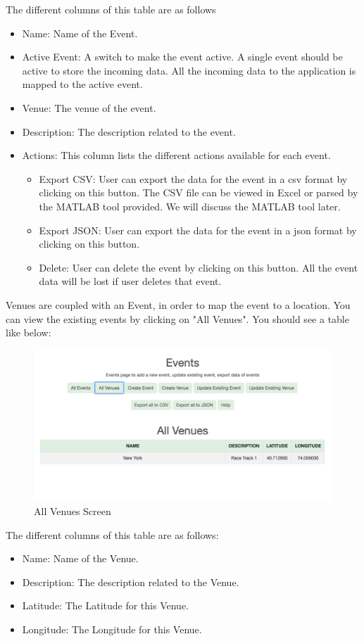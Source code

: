 \documentclass[12pt, letterpaper]{article}
\begin{document}
{{{{{{{{{\par The different columns of this table are as follows

\begin{itemize}
	\item Name: Name of the Event.
	\item Active Event: A switch to make the event active. A single event should be active to store the incoming data. All the incoming data to the application is mapped to the active event.
	\item Venue: The venue of the event.
	\item Description: The description related to the event.
	\item Actions: This column lists the different actions available for each event. \\
	\newpage
	\begin{itemize}
		\item Export CSV: User can export the data for the event in a csv format by clicking on this button. The CSV file can be viewed in Excel or parsed by the MATLAB tool provided. We will discuss the MATLAB tool later.
		\item Export JSON: User can export the data for the event in a json format by clicking on this button.
		\item Delete: User can delete the event by clicking on this button. All the event data will be lost if user deletes that event.
	\end{itemize}
\end{itemize}

\par Venues are coupled with an Event, in order to map the event to a location. You can view the existing events by clicking on "All Venues". You should see a table like below:
\begin{figure}[h!]
	\centering
	\includegraphics[width=1\columnwidth]{assets/all_venues.png}
	\caption{All Venues Screen}
	\end{figure}		
\newpage
\par The different columns of this table are as follows:
\begin{itemize}
	\item Name: Name of the Venue.
	\item Description: The description related to the Venue.
	\item Latitude: The Latitude for this Venue.
	\item Longitude: The Longitude for this Venue.
\end{itemize}

}}}}}}}}}
\end{document}
